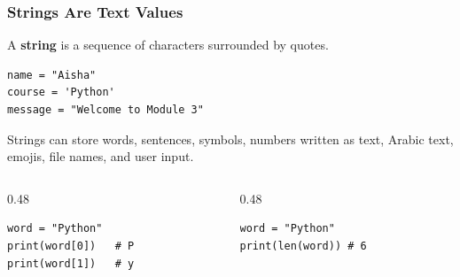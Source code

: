 \documentclass[aspectratio=169,10pt]{beamer}
\newcommand{\keyword}[1]{\textcolor{PrimaryBlue}{\textbf{#1}}}
\begin{document}
\begin{frame}[fragile]
\frametitle{Strings Are Text Values}
\small
A \keyword{string} is a sequence of characters surrounded by quotes.

\vspace{0.2cm}
\begin{lstlisting}[style=pycode]
name = "Aisha"
course = 'Python'
message = "Welcome to Module 3"
\end{lstlisting}

\begin{tcolorbox}[lecturebox,title=Key idea]
Strings can store words, sentences, symbols, numbers written as text, Arabic text, emojis, file names, and user input.
\end{tcolorbox}

\vspace{0.15cm}
\begin{columns}[T,totalwidth=0.96\textwidth]
\begin{column}{0.48\textwidth}
\begin{tcolorbox}[lecturebox,title=String indexing]
\begin{lstlisting}[style=pycodesmall]
word = "Python"
print(word[0])   # P
print(word[1])   # y
\end{lstlisting}
\end{tcolorbox}
\end{column}
\begin{column}{0.48\textwidth}
\begin{tcolorbox}[lecturebox,title=String length]
\begin{lstlisting}[style=pycodesmall]
word = "Python"
print(len(word)) # 6
\end{lstlisting}
\end{tcolorbox}
\end{column}
\end{columns}
\end{frame}
\end{document}
